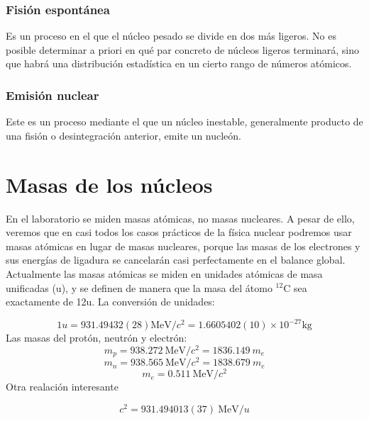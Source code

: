 \subsubsection{Fisión espontánea}

Es un proceso  en el que el núcleo pesado se divide en dos más ligeros. No es posible determinar a priori en qué par concreto de núcleos ligeros terminará, sino que habrá una distribución estadística en un cierto rango de números atómicos.

\subsubsection{Emisión nuclear}

Este es un proceso mediante el que un núcleo inestable, generalmente producto de una fisión o desintegración anterior, emite un nucleón.

\section{Masas de los núcleos}

En el laboratorio se miden masas atómicas, no masas nucleares. A pesar de ello, veremos que en casi todos los casos prácticos de la física nuclear podremos usar masas atómicas en lugar de masas nucleares, porque las masas de los electrones y sus energías de ligadura se cancelarán casi perfectamente en el balance global. Actualmente las masas atómicas se miden en unidades atómicas de masa unificadas (u), y se definen de manera que la masa del átomo $^{12}$C sea exactamente de 12u. La conversión de unidades:

\begin{equation}
	1u = 931.49432(28) \unit{\MeV/c^2} = 1.6605402(10) \times 10^{-27} \unit{\kg}
\end{equation}
Las masas del protón, neutrón y electrón:
\begin{equation}
	m_p = 938.272  \ \unit{\MeV/c^2} = 1836.149 \ m_e
\end{equation} 
\begin{equation}
	m_n = 938.565 \ \unit{\MeV/c^2} = 1838.679 \ m_e
\end{equation}
\begin{equation}
	m_e = 0.511 \ \unit{\MeV/c^2}
\end{equation}
Otra realación interesante

\begin{equation}
	c^2 = 931.494013(37)\ \unit{\MeV/u}
\end{equation}

